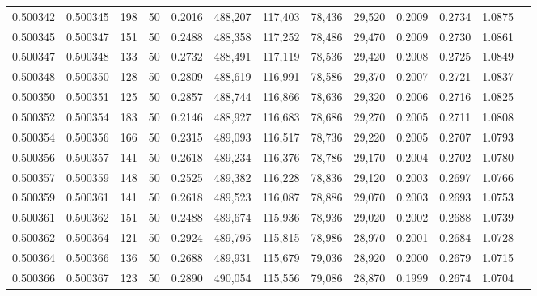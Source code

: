 \begin{tabular}{rrrrrrrrrrrrr}
0.500342 & 0.500345 & 198 &  50 &                                     0.2016 & 488,207 & 117,403 &  78,436 &  29,520 & 0.2009 & 0.2734 & 1.0875 \\
0.500345 & 0.500347 & 151 &  50 &                                     0.2488 & 488,358 & 117,252 &  78,486 &  29,470 & 0.2009 & 0.2730 & 1.0861 \\
0.500347 & 0.500348 & 133 &  50 &                                     0.2732 & 488,491 & 117,119 &  78,536 &  29,420 & 0.2008 & 0.2725 & 1.0849 \\
0.500348 & 0.500350 & 128 &  50 &                                     0.2809 & 488,619 & 116,991 &  78,586 &  29,370 & 0.2007 & 0.2721 & 1.0837 \\
0.500350 & 0.500351 & 125 &  50 &                                     0.2857 & 488,744 & 116,866 &  78,636 &  29,320 & 0.2006 & 0.2716 & 1.0825 \\
0.500352 & 0.500354 & 183 &  50 &                                     0.2146 & 488,927 & 116,683 &  78,686 &  29,270 & 0.2005 & 0.2711 & 1.0808 \\
0.500354 & 0.500356 & 166 &  50 &                                     0.2315 & 489,093 & 116,517 &  78,736 &  29,220 & 0.2005 & 0.2707 & 1.0793 \\
0.500356 & 0.500357 & 141 &  50 &                                     0.2618 & 489,234 & 116,376 &  78,786 &  29,170 & 0.2004 & 0.2702 & 1.0780 \\
0.500357 & 0.500359 & 148 &  50 &                                     0.2525 & 489,382 & 116,228 &  78,836 &  29,120 & 0.2003 & 0.2697 & 1.0766 \\
0.500359 & 0.500361 & 141 &  50 &                                     0.2618 & 489,523 & 116,087 &  78,886 &  29,070 & 0.2003 & 0.2693 & 1.0753 \\
0.500361 & 0.500362 & 151 &  50 &                                     0.2488 & 489,674 & 115,936 &  78,936 &  29,020 & 0.2002 & 0.2688 & 1.0739 \\
0.500362 & 0.500364 & 121 &  50 &                                     0.2924 & 489,795 & 115,815 &  78,986 &  28,970 & 0.2001 & 0.2684 & 1.0728 \\
0.500364 & 0.500366 & 136 &  50 &                                     0.2688 & 489,931 & 115,679 &  79,036 &  28,920 & 0.2000 & 0.2679 & 1.0715 \\
0.500366 & 0.500367 & 123 &  50 &                                     0.2890 & 490,054 & 115,556 &  79,086 &  28,870 & 0.1999 & 0.2674 & 1.0704 \\

\end{tabular}
